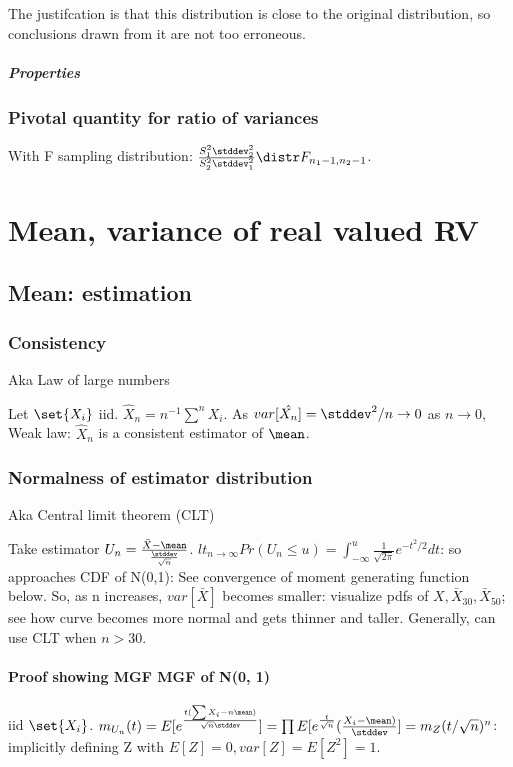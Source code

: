 \documentclass[oneside, article]{memoir}
\begin{document}
The justifcation is that this distribution is close to the original distribution, so conclusions drawn from it are not too erroneous.

\paragraph{Properties}

\tbc

\subsection{Pivotal quantity for ratio of variances}
With F sampling distribution: $\frac{S_{1}^{2}\stddev_{2}^{2}}{S_{2}^{2}\stddev_{1}^{2}} \distr F_{n_{1}-1, n_{2}-1}$.

\chapter{Mean, variance of real valued RV}
\section{Mean: estimation}
\subsection{Consistency}
Aka Law of large numbers

Let $\set{X_{i}}$ iid. $\hat{X}_{n} = n^{-1}\sum^{n} X_{i}$. As $var[\hat{X_{n}}] = \stddev^{2}/n \to 0$ as $n \to 0$, Weak law: $\hat{X}_{n}$ is a consistent estimator of $\mean$.

\subsection{Normalness of estimator distribution}
Aka Central limit theorem (CLT)

Take estimator $U_{n} = \frac{\bar{X} - \mean}{\frac{\stddev}{\sqrt{n}}}$. $lt_{n\to \infty} Pr(U_{n} \leq u) = \int_{-\infty}^{u} \frac{1}{\sqrt{2\pi}}e^{-t^{2}/2}dt$: so approaches CDF of N(0,1): See convergence of moment generating function below. So, as n increases, $var[\bar{X}]$ becomes smaller: visualize pdfs of $X, \bar{X}_{30}, \bar{X}_{50}$; see how curve becomes more normal and gets thinner and taller. Generally, can use CLT when $n>30$.

\subsubsection{Proof showing MGF  MGF of N(0, 1)}
iid $\set{X_{i}}$. $m_{U_{n}}(t) = E[e^{\frac{t(\sum X_{i} - n\mean)}{\sqrt{n}\stddev}}] = \prod E[e^{\frac{t}{\sqrt{n}}}(\frac{X_{i} - \mean)}{\stddev}] = m_{Z}(t/\sqrt{n})^{n}$: implicitly defining Z with $E[Z] = 0, var[Z] = E[Z^{2}] = 1$.
\end{document}
